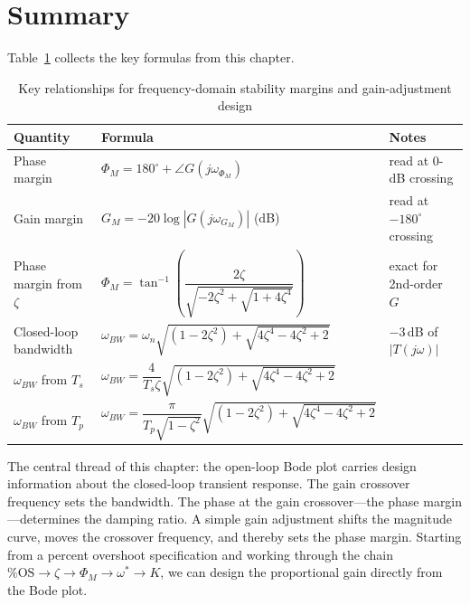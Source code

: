 \documentclass[../../book.tex]{subfiles}
\begin{document}
\section{Summary}
\label{sec:summary}

Table~\ref{tab:summary} collects the key formulas from this chapter.

\begin{table}[htbp]
  \centering
  \caption{Key relationships for frequency-domain stability margins and gain-adjustment design}
  \label{tab:summary}
  \renewcommand{\arraystretch}{1.6}
  \begin{tabular}{@{}p{3.8cm}p{6.5cm}p{3.2cm}@{}}
    \toprule
    Quantity & Formula & Notes \\
    \midrule
    Phase margin
      & $\Phi_M = 180^\circ + \angle G(j\omega_{\Phi_M})$
      & read at 0-dB crossing \\
    Gain margin
      & $G_M = -20\log|G(j\omega_{G_M})|$ (dB)
      & read at $-180^\circ$ crossing \\
    Phase margin from $\zeta$
      & $\Phi_M = \tan^{-1}\!\!\left(\dfrac{2\zeta}{\sqrt{-2\zeta^2+\sqrt{1+4\zeta^4}}}\right)$
      & exact for 2nd-order $G$ \\
    Closed-loop bandwidth
      & $\omega_{BW} = \omega_n\sqrt{(1-2\zeta^2)+\sqrt{4\zeta^4-4\zeta^2+2}}$
      & $-3$\,dB of $|T(j\omega)|$ \\
    $\omega_{BW}$ from $T_s$
      & $\omega_{BW} = \dfrac{4}{T_s\zeta}\sqrt{(1-2\zeta^2)+\sqrt{4\zeta^4-4\zeta^2+2}}$
      & \\
    $\omega_{BW}$ from $T_p$
      & $\omega_{BW} = \dfrac{\pi}{T_p\sqrt{1-\zeta^2}}\sqrt{(1-2\zeta^2)+\sqrt{4\zeta^4-4\zeta^2+2}}$
      & \\
    \bottomrule
  \end{tabular}
\end{table}

The central thread of this chapter: the open-loop Bode plot carries design
information about the closed-loop transient response.  The gain crossover
frequency sets the bandwidth.  The phase at the gain crossover---the phase
margin---determines the damping ratio.  A simple gain adjustment shifts the
magnitude curve, moves the crossover frequency, and thereby sets the phase
margin.  Starting from a percent overshoot specification and working through
the chain $\text{\%OS} \to \zeta \to \Phi_M \to \omega^* \to K$, we can
design the proportional gain directly from the Bode plot.
\end{document}
